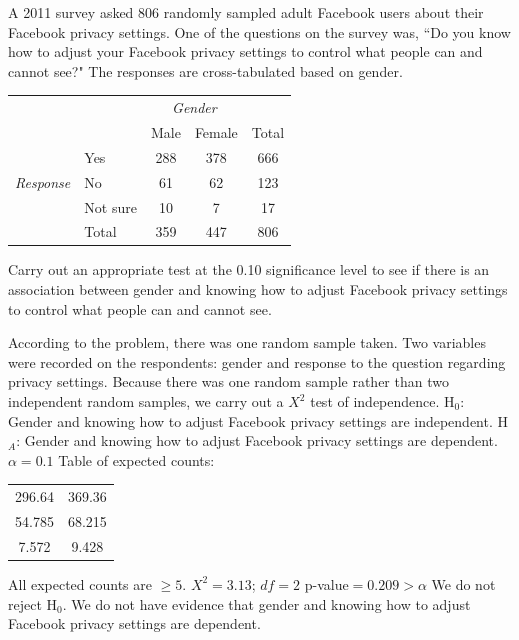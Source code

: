 \begin{example}{A 2011 survey asked 806 randomly sampled adult Facebook users about their Facebook privacy settings. One of the questions on the survey was, ``Do you know how to adjust your Facebook privacy settings to control what people can and cannot see?" The responses are cross-tabulated based on gender. 
\label{facebookprivacy}
\begin{center}
\begin{tabular}{l l c c c}
								&			& \multicolumn{2}{c}{\textit{Gender}}	&		\\
\cline{3-4}
								&			& Male		& Female		& Total	\\
\cline{2-5}
								& Yes		& 288		& 378		& 666	\\
\textit{Response}					& No			& 61			& 62 			& 123	\\
								& Not sure	& 10			& 7 			& 17	\\
\cline{2-5}
								& Total		& 359		& 447		& 806
\end{tabular}
\end{center}
Carry out an appropriate test at the 0.10 significance level to see if there is an association between gender and knowing how to adjust Facebook privacy settings to control what people can and cannot see.}
According to the problem, there was one random sample taken. Two variables were recorded on the respondents: gender and response to the question regarding privacy settings. Because there was one random sample rather than two independent random samples, we carry out a  $X^2$ test of independence.
\newline H$_0$: Gender and knowing how to adjust Facebook privacy settings are independent.
\newline H$_A$: Gender and knowing how to adjust Facebook privacy settings are dependent.
 $\alpha=0.1$
\newline \newline Table of expected counts: \\
\begin{tabular}{c c}
296.64 & 369.36\\
54.785 & 68.215 \\
7.572 & 9.428\\
\end{tabular}
\newline All expected counts are $\ge 5$.
 $X^2 = 3.13$; $df = 2$
 p-value$ = 0.209 > \alpha$
We do not reject H$_0$. We do not have evidence that gender and knowing how to adjust Facebook privacy settings are dependent.
\end{example}


